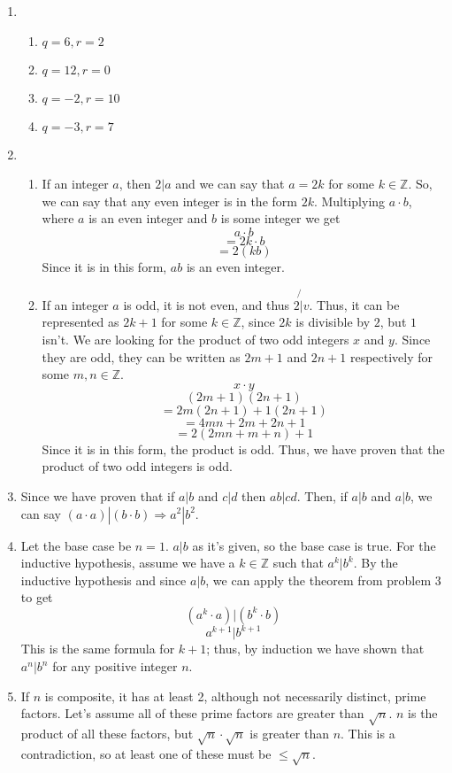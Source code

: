 \documentclass{article}
\begin{document}
\begin{enumerate}[label=\textbf{\arabic*}.]
    \Large
    \item
    \begin{enumerate}[label=\textbf{\alph*}.]
        \item $q=6,r=2$
        \item $q=12,r=0$
        \item $q=-2,r=10$
        \item $q=-3,r=7$
    \end{enumerate}
    \item 
    \begin{enumerate}[label=\textbf{\alph*}.]
        \item If an integer $a$, then $2|a$ and we can say that $a=2k$ for some $k\in\mathbb{Z}$. So, we can say that any even integer is in the form $2k$. Multiplying $a\cdot b$, where $a$ is an even integer and $b$ is some integer we get
        \[a\cdot b\]
        \[=2k\cdot b\]
        \[=2(kb)\]
        Since it is in this form, $ab$ is an even integer.
        \item If an integer $a$ is odd, it is not even, and thus $2\not{|}v$. Thus, it can be represented as $2k+1$ for some $k\in\mathbb{Z}$, since $2k$ is divisible by $2$, but $1$ isn't. We are looking for the product of two odd integers $x$ and $y$. Since they are odd, they can be written as $2m+1$ and $2n+1$ respectively for some $m,n\in\mathbb{Z}$.
        \[x\cdot y\]
        \[(2m+1)(2n+1)\]
        \[=2m(2n+1)+1(2n+1)\]
        \[=4mn+2m+2n+1\]
        \[=2(2mn+m+n)+1\]
        Since it is in this form, the product is odd. Thus, we have proven that the product of two odd integers is odd.
    \end{enumerate}
    \item Since we have proven that if $a|b$ and $c|d$ then $ab|cd$. Then, if $a|b$ and $a|b$, we can say $(a\cdot a)|(b \cdot b) \Rightarrow a^2|b^2$.
    \item Let the base case be $n=1$. $a|b$ as it's given, so the base case is true.
    For the inductive hypothesis, assume we have a $k\in\mathbb{Z}$ such that $a^k|b^k$. By the inductive hypothesis and since $a|b$, we can apply the theorem from problem 3 to get 
    \[(a^k\cdot a)|(b^k\cdot b)\]
    \[a^{k+1}|b^{k+1}\]
    This is the same formula for $k+1$; thus, by induction we have shown that $a^n|b^n$ for any positive integer $n$.
    \item If $n$ is composite, it has at least 2, although not necessarily distinct, prime factors. Let's assume all of these prime factors are greater than $\sqrt{n}$. $n$ is the product of all these factors, but $\sqrt{n}\cdot\sqrt{n}$ is greater than $n$. This is a contradiction, so at least one of these must be $\leq\sqrt{n}$.

\end{enumerate}
\end{document}
